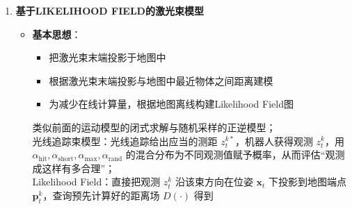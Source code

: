 \documentclass[../main.tex]{subfiles}
\begin{document}
\begin{enumerate}
\begin{itemize}
\begin{itemize}
                    $\mathbf{Z}=\{z_i\}$ \\
                    $\mathbf{X}=\{\mathbf{x}_i\}$ \\
                    $\mathbf{m}$ .
                    
            \end{itemize}
                \item \textbf{优点}：
                \begin{itemize}
                    \item 物理意义非常明确
                    \item 对地图形式没有要求
                \end{itemize}
                \item \textbf{缺点}：
                \begin{itemize}
                    \item 计算：光线追踪算法耗时较大
                    \item 光滑性差：当地图中有很多小障碍物时，概率分布连续性很差，使得定位算法难以收敛
                \end{itemize}                
            \end{itemize}
 \item \textbf{基于LIKELIHOOD FIELD的激光束模型}
 \begin{itemize}
     \item \textbf{基本思想}：
     \begin{itemize}
         \item 把激光束末端投影于地图中
         \item 根据激光束末端投影与地图中最近物体之间距离建模
         \item 为减少在线计算量，根据地图离线构建Likelihood Field图
     \end{itemize}
        {\small\kaishu
        类似前面的运动模型的闭式求解与随机采样的正逆模型；\\
        \vspace{1em}
        光线追踪束模型：光线追踪给出应当的测距 $z_{t}^{k*}$，机器人获得观测 $z_t^k$，用$\alpha_{\mathrm{hit}},\alpha_{\mathrm{short}},\alpha_{\mathrm{max}},\alpha_{\mathrm{rand}}$
        的混合分布为不同观测值赋予概率，从而评估“观测成这样有多合理”；\\
        \vspace{1em}
        Likelihood Field：直接把观测 $z_t^k$ 沿该束方向在位姿 $\mathbf{x}_t$ 下投影到地图端点
        $\mathbf{p}_{t}^{k}$，查询预先计算好的距离场 $D(\cdot)$ 得到
}
\end{itemize}
\end{enumerate}
\end{document}
